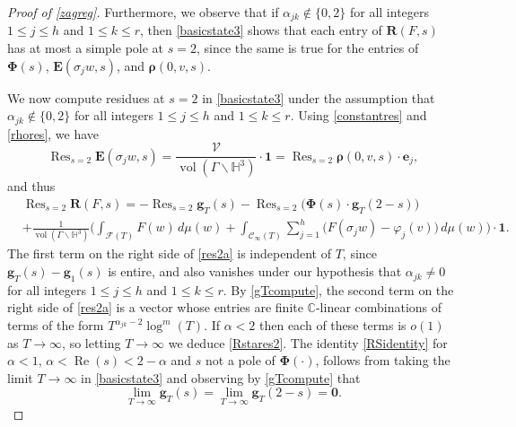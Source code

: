 \documentclass[12pt,reqno]{amsart}
\numberwithin{equation}{section}
\renewcommand{\Re}{\operatorname{Re}}
\DeclareMathOperator*{\Res}{Res}
\DeclareMathOperator{\vol}{vol}
\begin{document}
\begin{proof}[Proof of \cref{zagreg}]
Furthermore, we observe that if $\alpha_{jk} \not\in \{0, 2\}$ for all integers $1\leq j\leq h$ and $1\leq k \leq r$, then \eqref{basicstate3} shows that each entry of $\boldsymbol{R}(F, s)$ has at most a simple pole at $s=2$, since the same is true for the entries of $\boldsymbol{\Phi}(s)$, $\boldsymbol{E}(\sigma_jw, s)$, and $\boldsymbol{\rho}(0, v, s)$.

We now compute residues at $s=2$ in \eqref{basicstate3} under the assumption that $\alpha_{jk} \not \in \{0,2\}$ for all integers $1\leq j\leq h$ and $1\leq k \leq r$. 
Using \eqref{constantres} and \eqref{rhores}, we have
\begin{equation*}
    \Res_{s=2} \boldsymbol{E}(\sigma_{j} w,s)=\frac{\mathcal{V}}{\vol(\Gamma \backslash \mathbb{H}^3)} \cdot \boldsymbol{1} = \Res_{s=2} \boldsymbol{\rho}(0,v,s)
    \cdot \boldsymbol{e}_j,
\end{equation*}
and thus 
\begin{align}
    & \Res_{s=2} \boldsymbol{R}(F,s) = -\Res_{s=2} \boldsymbol{g}_T(s) -\Res_{s=2} \big( \boldsymbol{\Phi}(s) \cdot
    \boldsymbol{g}_T(2-s) \big)  \label{res2a} \\
    &+ \frac{1}{\vol(\Gamma \backslash \mathbb{H}^3)} \Big( \int_{\mathcal{F}(T)} F(w) \, d \mu(w)  
    + \int_{\mathcal{C}_{\infty}(T)} \sum_{j=1}^{h} \Big( F(\sigma_{j} w)- \varphi_{j}(v) \Big) \, d \mu(w) \Big) \cdot \boldsymbol{1}. \qquad \label{res2b}
\end{align}
The first term on the right side of \eqref{res2a} is independent of $T$, since $\boldsymbol{g}_T(s)-\boldsymbol{g}_1(s)$ is entire, and also vanishes under our hypothesis that $\alpha_{jk} \neq 0$ for all integers $1\leq j \leq h$ and $1 \leq k \leq r$. By \eqref{gTcompute}, the second term on the right side of \eqref{res2a} is a vector whose entries are finite $\mathbb{C}$-linear combinations of terms of the form $T^{\alpha_{jk}-2} \log^{m}(T)$. If $\alpha<2$ then each of these terms is $o(1)$ as $T \to \infty$, so letting $T \to \infty$ we deduce \eqref{Rstares2}. 
The identity \eqref{RSidentity} for $\alpha < 1$, $\alpha<\Re(s)<2-\alpha$ and $s$ not a pole of $\boldsymbol{\Phi}(\cdot)$,
follows from taking the limit $T \to \infty$ in \eqref{basicstate3} and observing by \eqref{gTcompute} that 
\begin{equation*}
    \lim_{T \to \infty} \boldsymbol{g}_{T}(s)=\lim_{T \to \infty} \boldsymbol{g}_{T}(2-s)=\boldsymbol{0}.
\end{equation*}
\end{proof}
\end{document}
